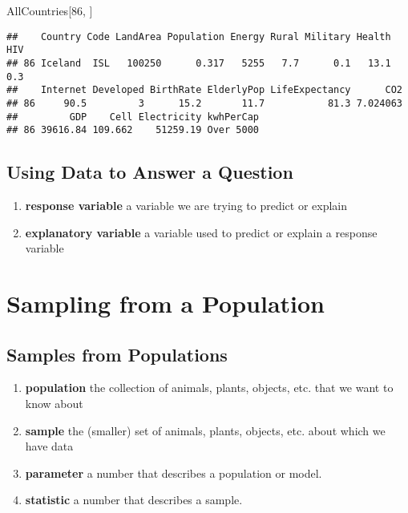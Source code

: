 \documentclass[]{book}
\newenvironment{Shaded}{\begin{snugshade}}{\end{snugshade}}
\newcommand{\DecValTok}[1]{\textcolor[rgb]{0.00,0.00,0.81}{#1}}
\newcommand{\NormalTok}[1]{#1}
\providecommand{\tightlist}{%
  \setlength{\itemsep}{0pt}\setlength{\parskip}{0pt}}
\begin{document}
\begin{Shaded}
\begin{Highlighting}[]
\NormalTok{AllCountries[}\DecValTok{86}\NormalTok{, ]}
\end{Highlighting}
\end{Shaded}

\begin{verbatim}
##    Country Code LandArea Population Energy Rural Military Health HIV
## 86 Iceland  ISL   100250      0.317   5255   7.7      0.1   13.1 0.3
##    Internet Developed BirthRate ElderlyPop LifeExpectancy      CO2
## 86     90.5         3      15.2       11.7           81.3 7.024063
##         GDP    Cell Electricity kwhPerCap
## 86 39616.84 109.662    51259.19 Over 5000
\end{verbatim}

\hypertarget{using-data-to-answer-a-question}{%
\subsection{Using Data to Answer a Question}\label{using-data-to-answer-a-question}}

\begin{enumerate}
\tightlist
\item
  \textbf{response variable}
  a variable we are trying to predict or explain
\item
  \textbf{explanatory variable}
  a variable used to predict or explain a response variable
\end{enumerate}

\hypertarget{sampling-from-a-population}{%
\section{Sampling from a Population}\label{sampling-from-a-population}}

\hypertarget{samples-from-populations}{%
\subsection{Samples from Populations}\label{samples-from-populations}}

\begin{enumerate}
\tightlist
\item
  \textbf{population}
  the collection of animals, plants, objects, etc. that we want to know about
\item
  \textbf{sample}
  the (smaller) set of animals, plants, objects, etc. about which we have data
\item
  \textbf{parameter}
  a number that describes a population or model.
\item
  \textbf{statistic}
  a number that describes a sample.
\end{enumerate}
\end{document}
